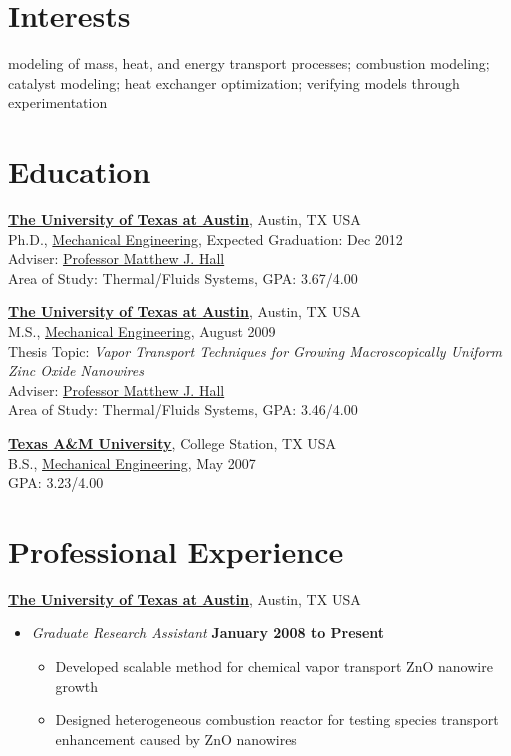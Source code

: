 \documentclass[line,margin]{res}
\begin{document}
\address{\href{mailto:calbaker@utexas.edu}{calbaker@utexas.edu}} 
\address{214-695-4636}
 
\begin{resume}
 
\section{Interests}
%
modeling of mass, heat, and energy transport processes; combustion
modeling; catalyst modeling; heat exchanger optimization; verifying
models through experimentation
 
\section{Education}
%
\href{http://www.utexas.edu/}{\textbf{The University of Texas at
    Austin}}, Austin, TX USA \\
Ph.D., \href{http://www.me.utexas.edu/}{Mechanical Engineering},
Expected Graduation: Dec 2012 \\ 
Adviser:
\href{http://www.me.utexas.edu/directory/faculty/hall/matthew/33/}{Professor
  Matthew J. Hall} \\
Area of Study: Thermal/Fluids Systems, GPA: 3.67/4.00

\href{http://www.utexas.edu/}{\textbf{The University of Texas at
    Austin}}, Austin, TX USA \\ 
M.S., \href{http://www.me.utexas.edu/}{Mechanical Engineering}, August
2009 \\
Thesis Topic: \emph{Vapor Transport Techniques for Growing
  Macroscopically Uniform Zinc Oxide Nanowires} \\
Adviser:
\href{http://www.me.utexas.edu/directory/faculty/hall/matthew/33/}{Professor
  Matthew J. Hall} \\
Area of Study: Thermal/Fluids Systems, GPA: 3.46/4.00

\href{http://www.tamu.edu/}{\textbf{Texas A\&M University}}, College
Station, TX USA \\
B.S., \href{http://www.mengr.tamu.edu/}{Mechanical Engineering}, May
2007  \\
GPA: 3.23/4.00

\section{Professional Experience}

\href{http://www.utexas.edu/}{\textbf{The University of Texas at
    Austin}}, Austin, TX USA
\begin{itemize}
\item \textit{Graduate Research Assistant}%
  \hfill \textbf{January 2008 to Present}
  \begin{itemize}
  \item Developed scalable method for chemical vapor transport ZnO
    nanowire growth
  \item Designed heterogeneous combustion reactor for testing species
    transport enhancement caused by ZnO nanowires
  \end{itemize}~
\end{itemize}


\end{resume}
\end{document}
